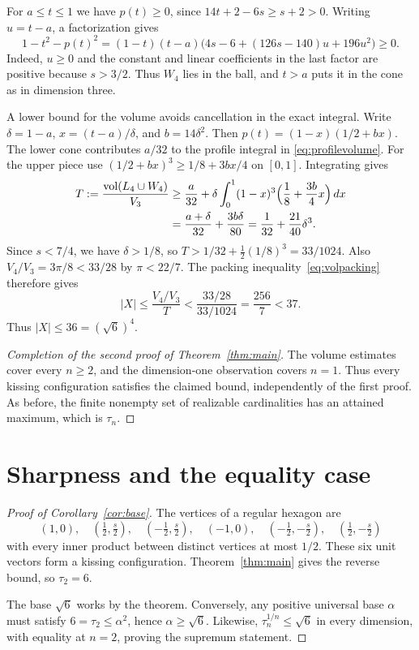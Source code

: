 \documentclass[11pt,a4paper]{article}
\theoremstyle{remark}
\newcommand{\vol}{\operatorname{vol}}
\begin{document}
For $a\leq t\leq1$ we have $p(t)\geq0$, since $14t+2-6s\geq s+2>0$. Writing $u=t-a$, a factorization gives
\begin{equation}\label{eq:fourcontainment}
 1-t^2-p(t)^2
 =(1-t)(t-a)\bigl(4s-6+(126s-140)u+196u^2\bigr)\geq0.
\end{equation}
Indeed, $u\geq0$ and the constant and linear coefficients in the last factor are positive because $s>3/2$. Thus $W_4$ lies in the ball, and $t>a$ puts it in the cone as in dimension three.

A lower bound for the volume avoids cancellation in the exact integral. Write
$\delta=1-a$, $x=(t-a)/\delta$, and $b=14\delta^2$. Then
$p(t)=(1-x)(1/2+bx)$. The lower cone contributes $a/32$ to the profile integral in \eqref{eq:profilevolume}. For the upper piece use
$(1/2+bx)^3\geq 1/8+3bx/4$ on $[0,1]$. Integrating gives
\begin{align*}
 T:=\frac{\vol(L_4\cup W_4)}{V_3}
 &\geq\frac{a}{32}
    +\delta\int_0^1(1-x)^3\Bigl(\frac18+\frac{3b}{4}x\Bigr)\,dx\\
 &=\frac{a+\delta}{32}+\frac{3b\delta}{80}
  =\frac1{32}+\frac{21}{40}\delta^3 .
\end{align*}
Since $s<7/4$, we have $\delta>1/8$, so $T>1/32+\tfrac12(1/8)^3=33/1024$. Also $V_4/V_3=3\pi/8<33/28$ by $\pi<22/7$. The packing inequality~\eqref{eq:volpacking} therefore gives
\[
 |X|\leq\frac{V_4/V_3}{T}<\frac{33/28}{33/1024}=\frac{256}{7}<37.
\]
Thus $|X|\leq36=(\sqrt6)^4$.

\begin{proof}[Completion of the second proof of Theorem~\ref{thm:main}]
The volume estimates cover every $n\geq2$, and the dimension-one observation covers $n=1$. Thus every kissing configuration satisfies the claimed bound, independently of the first proof. As before, the finite nonempty set of realizable cardinalities has an attained maximum, which is $\tau_n$.
\end{proof}

\section{Sharpness and the equality case}

\begin{proof}[Proof of Corollary~\ref{cor:base}]
The vertices of a regular hexagon are
\[
 (1,0),\quad (\tfrac12,\tfrac{s}{2}),\quad
 (-\tfrac12,\tfrac{s}{2}),\quad (-1,0),\quad
 (-\tfrac12,-\tfrac{s}{2}),\quad (\tfrac12,-\tfrac{s}{2})
\]
with every inner product between distinct vertices at most $1/2$. These six unit vectors form a kissing configuration. Theorem~\ref{thm:main} gives the reverse bound, so $\tau_2=6$.

The base $\sqrt6$ works by the theorem. Conversely, any positive universal base $\alpha$ must satisfy $6=\tau_2\leq\alpha^2$, hence $\alpha\geq\sqrt6$. Likewise, $\tau_n^{1/n}\leq\sqrt6$ in every dimension, with equality at $n=2$, proving the supremum statement.
\end{proof}
\end{document}
